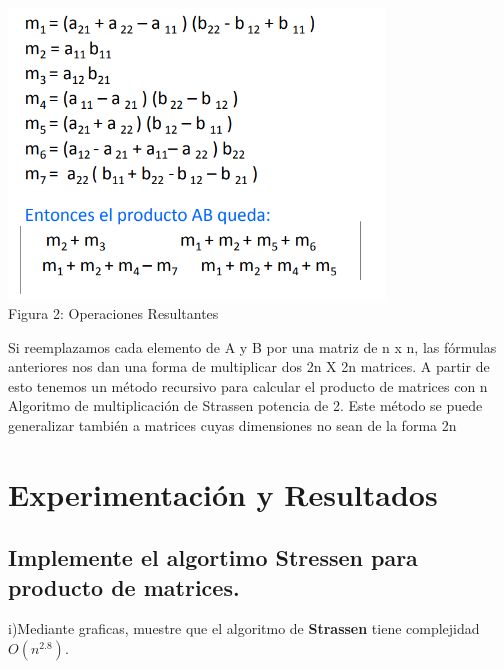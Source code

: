 \documentclass[spanish]{article}
\begin{document}
	\begin{center}
		\includegraphics[width=100mm]{./imagenes/fig3.png}\\
		Figura 2: Operaciones Resultantes
	\end{center}
	
	\bigskip
	
	Si reemplazamos cada elemento de A y B por una matriz de n x n, las fórmulas anteriores nos dan una forma de multiplicar dos 2n X 2n matrices.
	A partir de esto tenemos un método recursivo para calcular el producto de matrices con n Algoritmo de multiplicación de Strassen potencia de 2.
	Este método se puede generalizar también a matrices cuyas dimensiones no sean de la forma 2n 	

	\newpage	

	\section{Experimentaci\'on y Resultados}
	
	\subsection{Implemente el algortimo Stressen para producto de matrices.}
	
	{\large i)Mediante graficas, muestre que el algoritmo de {\bf Strassen} tiene complejidad $O(n^{2.8})$.}\\

	\bigskip
\end{document}
